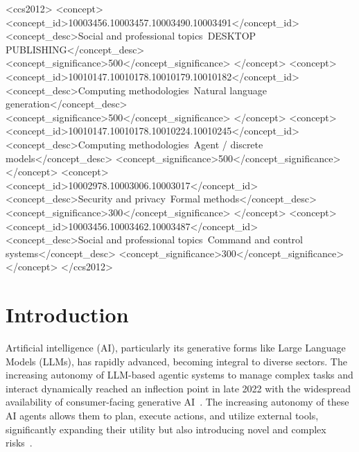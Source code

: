 \documentclass[sigconf,review,anonymous=false]{acmart} %
\begin{document}
\begin{CCSXML}
<ccs2012>
   <concept>
       <concept_id>10003456.10003457.10003490.10003491</concept_id>
       <concept_desc>Social and professional topics~DESKTOP PUBLISHING</concept_desc>
       <concept_significance>500</concept_significance>
       </concept>
   <concept>
       <concept_id>10010147.10010178.10010179.10010182</concept_id>
       <concept_desc>Computing methodologies~Natural language generation</concept_desc>
       <concept_significance>500</concept_significance>
       </concept>
   <concept>
       <concept_id>10010147.10010178.10010224.10010245</concept_id>
       <concept_desc>Computing methodologies~Agent / discrete models</concept_desc>
       <concept_significance>500</concept_significance>
       </concept>
   <concept>
       <concept_id>10002978.10003006.10003017</concept_id>
       <concept_desc>Security and privacy~Formal methods</concept_desc>
       <concept_significance>300</concept_significance>
       </concept>
   <concept>
       <concept_id>10003456.10003462.10003487</concept_id>
       <concept_desc>Social and professional topics~Command and control systems</concept_desc>
       <concept_significance>300</concept_significance>
       </concept>
 </ccs2012>
\end{CCSXML}



\maketitle

\section{Introduction}
Artificial intelligence (AI), particularly its generative forms like Large Language Models (LLMs), has rapidly advanced, becoming integral to diverse sectors. The increasing autonomy of LLM-based agentic systems to manage complex tasks and interact dynamically reached an inflection point in late 2022 with the widespread availability of consumer-facing generative AI~\cite{WorldBankAIGov24, LiMAST25}. The increasing autonomy of these AI agents allows them to plan, execute actions, and utilize external tools, significantly expanding their utility but also introducing novel and complex risks~\cite{AWSBedrockAgents}.
\end{document}
